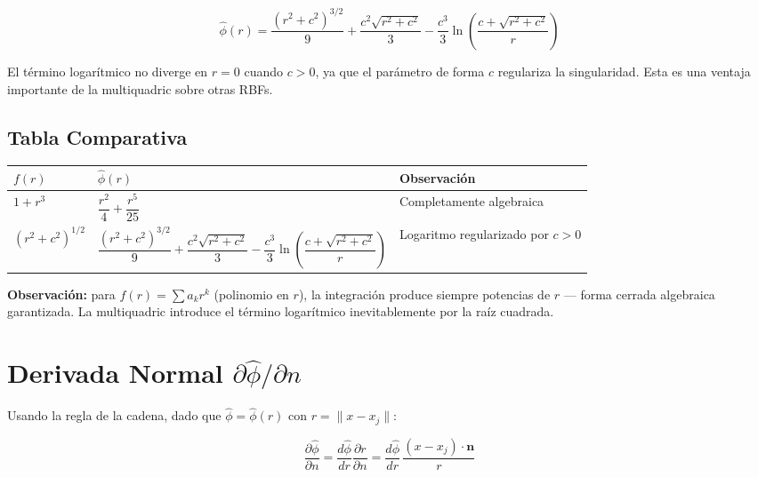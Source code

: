 \documentclass[12pt,a4paper]{article}
\begin{document}
\begin{equation}
\boxed{
    \hat{\phi}(r) = \frac{(r^2+c^2)^{3/2}}{9}
    + \frac{c^2\sqrt{r^2+c^2}}{3}
    - \frac{c^3}{3}\ln\!\left(\frac{c+\sqrt{r^2+c^2}}{r}\right)
}
\end{equation}

El término logarítmico no diverge en $r=0$ cuando $c>0$, ya que el parámetro
de forma $c$ regulariza la singularidad. Esta es una ventaja importante de la
multiquadric sobre otras RBFs.

\subsection{Tabla Comparativa}

\begin{center}
\begin{tabular}{lll}
\toprule
$f(r)$ & $\hat{\phi}(r)$ & Observación \\
\midrule
$1 + r^3$ & $\dfrac{r^2}{4} + \dfrac{r^5}{25}$ & Completamente algebraica \\[1.2em]
$(r^2+c^2)^{1/2}$ &
$\dfrac{(r^2+c^2)^{3/2}}{9} + \dfrac{c^2\sqrt{r^2+c^2}}{3}
- \dfrac{c^3}{3}\ln\!\left(\dfrac{c+\sqrt{r^2+c^2}}{r}\right)$ &
Logaritmo regularizado por $c>0$ \\
\bottomrule
\end{tabular}
\end{center}

\textbf{Observación:} para $f(r) = \sum a_k r^k$ (polinomio en $r$), la
integración produce siempre potencias de $r$ — forma cerrada algebraica
garantizada. La multiquadric introduce el término logarítmico inevitablemente
por la raíz cuadrada.

\section{Derivada Normal $\partial\hat{\phi}/\partial n$}

Usando la regla de la cadena, dado que $\hat{\phi} = \hat{\phi}(r)$ con
$r = \|x - x_j\|$:

\begin{equation}
    \frac{\partial\hat{\phi}}{\partial n}
    = \frac{d\hat{\phi}}{dr}\frac{\partial r}{\partial n}
    = \frac{d\hat{\phi}}{dr}\,\frac{(x - x_j)\cdot\mathbf{n}}{r}
\end{equation}
\end{document}

